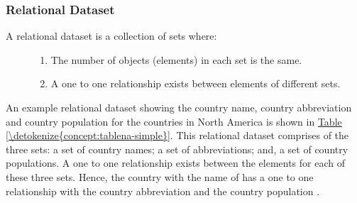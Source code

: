 \documentclass[letterpaper,11pt,english]{sphinxmanual}
\begin{document}
\subsubsection{Relational Dataset}
\label{\detokenize{concept:relational-dataset}}\begin{description}
\item[{A relational dataset is a collection of sets where:}] \leavevmode\begin{enumerate}
\def\theenumi{\arabic{enumi}}
\def\labelenumi{\theenumi .}
\makeatletter\def\p@enumii{\p@enumi \theenumi .}\makeatother
\item {} 
The number of objects (elements) in each set is the same.

\item {} 
A one to one relationship exists between elements of different sets.

\end{enumerate}

\end{description}

An example relational dataset showing the country name, country abbreviation and country population for the countries in North America is shown in \hyperref[\detokenize{concept:tablena-simple}]{Table \ref{\detokenize{concept:tablena-simple}}}.  This relational dataset comprises of the three sets: a set of country names; a set of abbreviations; and, a set of country populations.  A one to one relationship exists between the elements for each of these three sets.  Hence, the country with the name of  has a one to one relationship with the country abbreviation  and the country population .
\end{document}

